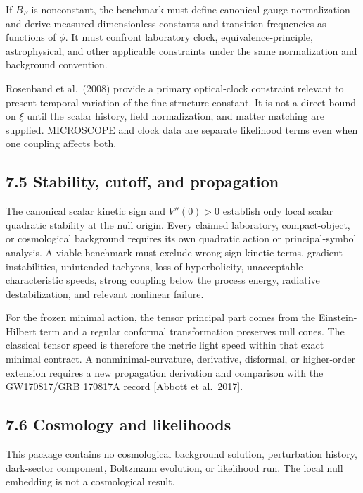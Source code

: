 \documentclass[
  american,
  11pt,
  letterpaper,
]{article}
\begin{document}
If \(B_F\) is nonconstant, the benchmark must define canonical gauge normalization and derive measured dimensionless constants and transition frequencies as functions of \(\phi\). It must confront laboratory clock, equivalence-principle, astrophysical, and other applicable constraints under the same normalization and background convention.

Rosenband et al.~(2008) provide a primary optical-clock constraint relevant to present temporal variation of the fine-structure constant. It is not a direct bound on \(\xi\) until the scalar history, field normalization, and matter matching are supplied. MICROSCOPE and clock data are separate likelihood terms even when one coupling affects both.

\subsection{7.5 Stability, cutoff, and propagation}\label{stability-cutoff-and-propagation}

The canonical scalar kinetic sign and \(V''(0)>0\) establish only local scalar quadratic stability at the null origin. Every claimed laboratory, compact-object, or cosmological background requires its own quadratic action or principal-symbol analysis. A viable benchmark must exclude wrong-sign kinetic terms, gradient instabilities, unintended tachyons, loss of hyperbolicity, unacceptable characteristic speeds, strong coupling below the process energy, radiative destabilization, and relevant nonlinear failure.

For the frozen minimal action, the tensor principal part comes from the Einstein-Hilbert term and a regular conformal transformation preserves null cones. The classical tensor speed is therefore the metric light speed within that exact minimal contract. A nonminimal-curvature, derivative, disformal, or higher-order extension requires a new propagation derivation and comparison with the GW170817/GRB 170817A record {[}Abbott et al.~2017{]}.

\subsection{7.6 Cosmology and likelihoods}\label{cosmology-and-likelihoods}

This package contains no cosmological background solution, perturbation history, dark-sector component, Boltzmann evolution, or likelihood run. The local null embedding is not a cosmological result.
\end{document}
